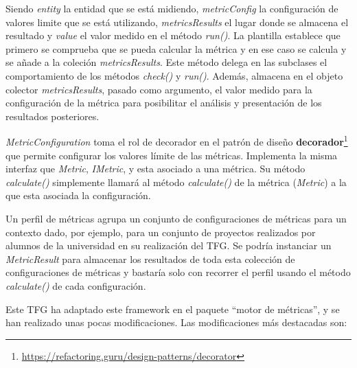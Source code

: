 Siendo \textit{entity} la entidad que se está midiendo, \textit{metricConfig} la configuración de valores limite que se está utilizando, \textit{metricsResults} el lugar donde se almacena el resultado y \textit{value} el valor medido en el método \textit{run()}. La plantilla establece que primero se comprueba que se pueda calcular la métrica y en ese caso se calcula y se añade a la coleción \textit{metricsResults}. 
Este método delega en las subclases el comportamiento de los métodos \textit{check()} y \textit{run()}. Además, almacena en el objeto colector \textit{metricsResults}, pasado como argumento, el valor medido para la configuración de la métrica para posibilitar el análisis y presentación de los resultados posteriores.

\textit{MetricConfiguration} toma el rol de decorador en el patrón de diseño \textbf{decorador}\footnote{\url{https://refactoring.guru/design-patterns/decorator}} que permite configurar los valores límite de las métricas. Implementa la misma interfaz que \textit{Metric}, \textit{IMetric}, y esta asociado a una métrica. Su método \textit{calculate()} simplemente llamará al método \textit{calculate()} de la métrica (\textit{Metric}) a la que esta asociada la configuración.

Un perfil de métricas agrupa un conjunto de configuraciones de métricas para un contexto dado, por ejemplo, para un conjunto de proyectos realizados por alumnos de la universidad en su realización del TFG. Se podría instanciar un \textit{MetricResult} para almacenar los resultados de toda esta colección de configuraciones de métricas y bastaría solo con recorrer el perfil usando el método \textit{calculate()} de cada configuración.

Este TFG ha adaptado este framework en el paquete ``motor de métricas'', y se han realizado unas pocas modificaciones. Las modificaciones más destacadas son:

